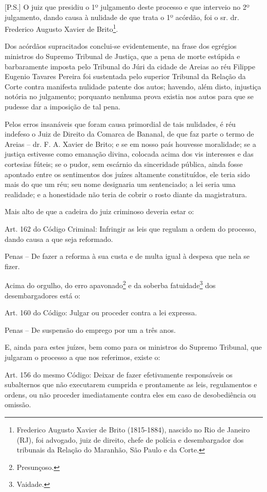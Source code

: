 {[}P.S.{]} O juiz que presidiu o 1º julgamento deste processo e que
interveio no 2º julgamento, dando causa à nulidade de que trata o 1º
acórdão, foi o sr. dr. Frederico Augusto Xavier de Brito\footnote{
  Frederico Augusto Xavier de Brito (1815-1884), nascido no Rio de
  Janeiro (RJ), foi advogado, juiz de direito, chefe de polícia e
  desembargador dos tribunais da Relação do Maranhão, São Paulo e da
  Corte.}.

Dos acórdãos supracitados conclui-se evidentemente, na frase dos
egrégios ministros do Supremo Tribunal de Justiça, que a pena de morte
estúpida e barbaramente imposta pelo Tribunal do Júri da cidade de
Areias ao réu Filippe Eugenio Tavares Pereira foi sustentada pelo
superior Tribunal da Relação da Corte contra manifesta nulidade patente
dos autos; havendo, além disto, injustiça notória no julgamento;
porquanto nenhuma prova existia nos autos para que se pudesse dar a
imposição de tal pena.

Pelos erros insanáveis que foram causa primordial de tais nulidades, é
réu indefeso o Juiz de Direito da Comarca de Bananal, de que faz parte o
termo de Areias -- dr. F. A. Xavier de Brito; e se em nosso país
houvesse moralidade; se a justiça estivesse como emanação divina,
colocada acima dos vis interesses e das cortesias fúteis; se o pudor,
sem escárnio da sinceridade pública, ainda fosse apontado entre os
sentimentos dos juízes altamente constituídos, ele teria sido mais do
que um réu; seu nome designaria um sentenciado; a lei seria uma
realidade; e a honestidade não teria de cobrir o rosto diante da
magistratura.

Mais alto de que a cadeira do juiz criminoso deveria estar o:

Art. 162 do Código Criminal: Infringir as leis que regulam a ordem do
processo, dando causa a que seja reformado.

Penas -- De fazer a reforma à sua custa e de multa igual à despesa que
nela se fizer.

Acima do orgulho, do erro apavonado\footnote{Presunçoso.} e da soberba
fatuidade\footnote{Vaidade.} dos desembargadores está o:

Art. 160 do Código: Julgar ou proceder contra a lei expressa.

Penas -- De suspensão do emprego por um a três anos.

E, ainda para estes juízes, bem como para os ministros do Supremo
Tribunal, que julgaram o processo a que nos referimos, existe o:

Art. 156 do mesmo Código: Deixar de fazer efetivamente responsáveis os
subalternos que não executarem cumprida e prontamente as leis,
regulamentos e ordens, ou não proceder imediatamente contra eles em caso
de desobediência ou omissão.

